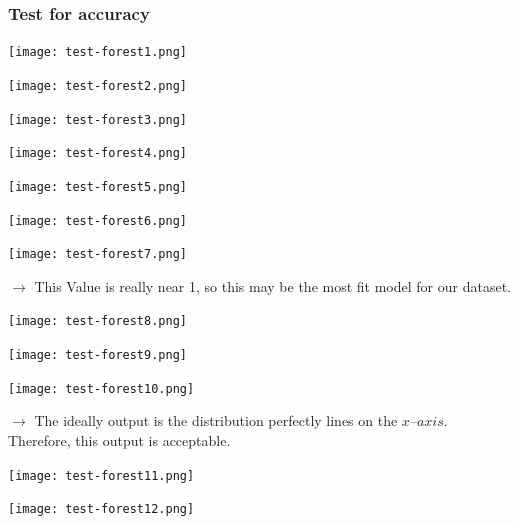 \subsubsection{Test for accuracy}

\begin{center}
    \texttt{[image: test-forest1.png]}
\end{center}

\begin{center}
    \texttt{[image: test-forest2.png]}
\end{center}

\begin{center}
    \texttt{[image: test-forest3.png]}
\end{center}

\begin{center}
    \texttt{[image: test-forest4.png]}
\end{center}

\begin{center}
    \texttt{[image: test-forest5.png]}
\end{center}

\begin{center}
    \texttt{[image: test-forest6.png]}
\end{center}

\begin{center}
    \texttt{[image: test-forest7.png]}
\end{center}

\tab $\rightarrow$ This Value is really near 1, so this may be the most fit model for our dataset.

\begin{center}
    \texttt{[image: test-forest8.png]}
\end{center}

\begin{center}
    \texttt{[image: test-forest9.png]}
\end{center}

\begin{center}
    \texttt{[image: test-forest10.png]}
\end{center}

\tab $\rightarrow$ The ideally output is the distribution perfectly lines on the $x – axis$. Therefore, this output is acceptable. 

\begin{center}
    \texttt{[image: test-forest11.png]}
\end{center}

\begin{center}
    \texttt{[image: test-forest12.png]}
\end{center}